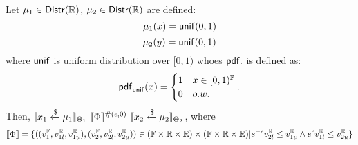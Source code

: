 \documentclass[a4paper,11pt]{article}
\begin{document}
\newpage
\begin{thm}
\label{thm:unif_coupling}
Let $\mu_1 \in \mathsf{Distr}(\mathbb{R})$, $\mu_2 \in \mathsf{Distr}(\mathbb{R})$ are defined:
\[
	{\mu_1}(x) = \mathsf{unif}(0, 1)
\]
\[
	{\mu_2}(y) = {\mathsf{unif}}(0, 1)
\]
where $\mathsf{unif}$ is uniform distribution over $[0, 1)$ whoes $\mathsf{pdf}.$ is defined as:
\[
	\mathsf{pdf}_{\mathsf{unif}}(x) = 
	\begin{cases}
	1 & x \in [0, 1)^{\mathbb{F}}\\
	0       & o.w.
	\end{cases}.
\]
Then, $	\llbracket x_1 \xleftarrow{\$} \mu_1 \rrbracket_{\Theta_1} 
		~ \llbracket \Phi \rrbracket^{\#(\epsilon, 0)} ~
		\llbracket x_2 \xleftarrow{\$} \mu_2 \rrbracket_{\Theta_2}$, 
where
\[
	\llbracket \Phi \rrbracket = 
	\{((v^{\mathbb{F}}_1, v^{\mathbb{R}}_{1l}, v^{\mathbb{R}}_{1u}), (v^{\mathbb{F}}_2, v^{\mathbb{R}}_{2l}, v^{\mathbb{R}}_{2u})) 
	\in (\mathbb{F} \times \mathbb{R} \times \mathbb{R}) \times (\mathbb{F} \times \mathbb{R} \times \mathbb{R})
	|
	e^{-\epsilon} v^{\mathbb{R}}_{2l} \leq v^{\mathbb{R}}_{1u}
	\land
	e^{\epsilon} v^{\mathbb{R}}_{1l} \leq v^{\mathbb{R}}_{2u}
	\}
\]
\end{thm}
\end{document}
